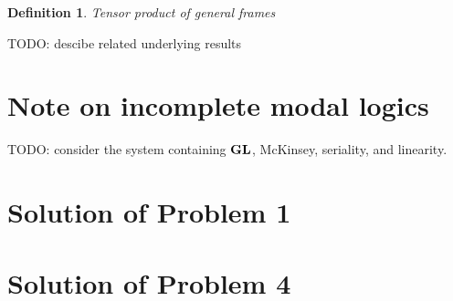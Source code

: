 \documentclass[a4paper]{article}
\theoremstyle{defin}
\newtheorem{defin}{Definition}
\theoremstyle{theorem}
\theoremstyle{prop}
\theoremstyle{lemma}
\theoremstyle{ex}
\theoremstyle{col}
\begin{document}
\begin{defin} Tensor product of general frames
\end{defin}

TODO: descibe related underlying results

\section{Note on incomplete modal logics}

TODO: consider the system containing ${\bf GL}$, McKinsey, seriality, and linearity.

\section{Solution of Problem 1}

\section{Solution of Problem 4}



\end{document}
